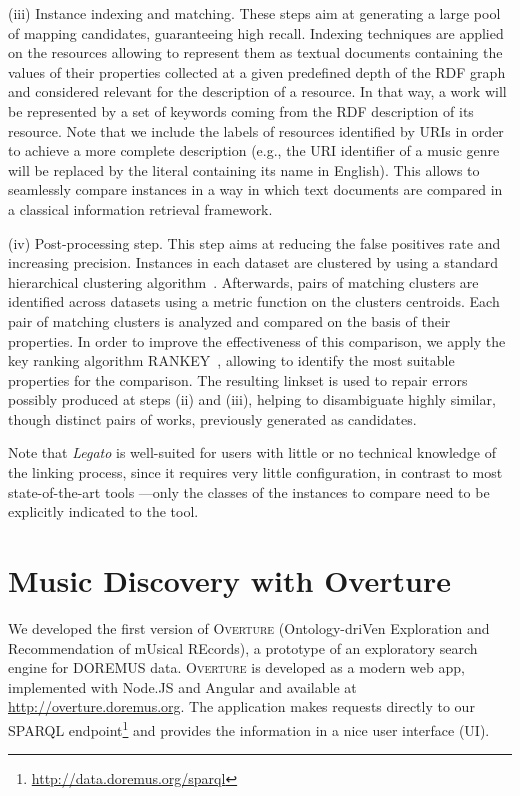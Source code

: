 (iii) Instance indexing and matching. These steps aim at generating a large pool of mapping candidates, guaranteeing high recall. Indexing techniques are applied on the resources allowing to represent them as textual documents containing the values of their properties collected at a given predefined depth of the RDF graph and considered relevant for the description of a resource. In that way, a work will be represented by a set of keywords coming from the RDF description of its resource. Note that we include the labels of resources identified by URIs in order to achieve a more complete description (e.g., the URI identifier of a music genre will be replaced by the literal containing its name in English). This allows to seamlessly compare instances in a way in which text documents are compared in a classical information retrieval framework.

(iv) Post-processing step. This step aims at reducing the false positives rate and increasing precision. Instances in each dataset are clustered by using a standard hierarchical clustering algorithm~\cite{rokach2005clustering}. Afterwards, pairs of matching clusters are identified across datasets using a metric function on the clusters centroids. Each pair of matching clusters is analyzed and compared on the basis of their properties. In order to improve the effectiveness of this comparison, we apply the key ranking algorithm RANKEY~\cite{achichi2016automatic}, allowing to identify the most suitable properties for the comparison. The resulting linkset is used to repair errors possibly produced at steps (ii) and (iii), helping to disambiguate highly similar, though distinct pairs of works, previously generated as candidates.

Note that \textit{Legato} is well-suited for users with little or no technical knowledge of the linking process, since it requires very little configuration, in contrast to most state-of-the-art tools \cite{nentwig2015survey}---only the classes of the instances to compare need to be explicitly indicated to the tool. 


\section{Music Discovery with Overture}
\label{sec:exploration}
We developed the first version of \textsc{Overture} (Ontology-driVen Exploration and Recommendation of mUsical REcords), a prototype of an exploratory search engine for DOREMUS data. \textsc{Overture} is developed as a modern web app, implemented with Node.JS and Angular and available at \url{http://overture.doremus.org}. The application makes requests directly to our SPARQL endpoint\footnote{\url{http://data.doremus.org/sparql}} and provides the information in a nice user interface (UI).

